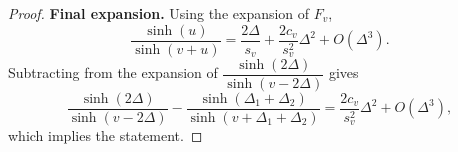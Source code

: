 \documentclass[11pt,twoside,reqno]{amsart}
\theoremstyle{plain}
\numberwithin{equation}{section}
\begin{document}
\begin{proof}
	\medskip
	\noindent\textbf{Final expansion.}
	Using the expansion of $F_v$,
	\[
	\frac{\sinh(u)}{\sinh(v+u)}
	= \frac{2\Delta}{s_v}+\frac{2c_v}{s_v^2}\Delta^2 + O(\Delta^3).
	\]
	Subtracting from the expansion of 
	\(\dfrac{\sinh(2\Delta)}{\sinh(v-2\Delta)}\) gives
	\[
	\frac{\sinh(2\Delta)}{\sinh(v-2\Delta)}
	-
	\frac{\sinh(\Delta_1+\Delta_2)}{\sinh(v+\Delta_1+\Delta_2)}
	= \frac{2c_v}{s_v^2}\Delta^2 + O(\Delta^3),
	\]
	which implies the statement.
\end{proof}



\newpage
\end{document}
